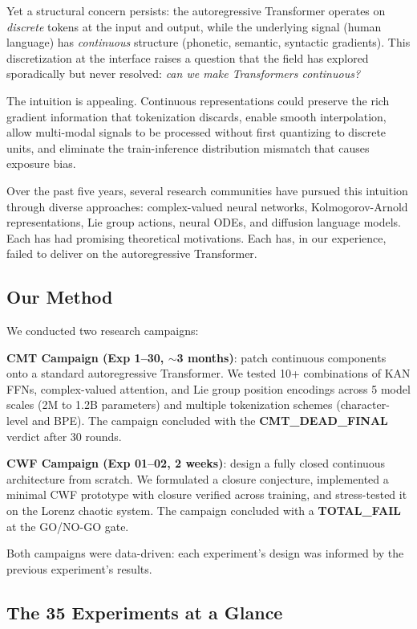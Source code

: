\documentclass{article}
\begin{document}
Yet a structural concern persists: the autoregressive Transformer operates on \emph{discrete} tokens at the input and output, while the underlying signal (human language) has \emph{continuous} structure (phonetic, semantic, syntactic gradients). This discretization at the interface raises a question that the field has explored sporadically but never resolved: \emph{can we make Transformers continuous?}

The intuition is appealing. Continuous representations could preserve the rich gradient information that tokenization discards, enable smooth interpolation, allow multi-modal signals to be processed without first quantizing to discrete units, and eliminate the train-inference distribution mismatch that causes exposure bias.

Over the past five years, several research communities have pursued this intuition through diverse approaches: complex-valued neural networks, Kolmogorov-Arnold representations, Lie group actions, neural ODEs, and diffusion language models. Each has had promising theoretical motivations. Each has, in our experience, failed to deliver on the autoregressive Transformer.

\subsection{Our Method}

We conducted two research campaigns:

\textbf{CMT Campaign (Exp 1--30, $\sim$3 months)}: patch continuous components onto a standard autoregressive Transformer. We tested 10+ combinations of KAN FFNs, complex-valued attention, and Lie group position encodings across 5 model scales (2M to 1.2B parameters) and multiple tokenization schemes (character-level and BPE). The campaign concluded with the \textbf{CMT\_DEAD\_FINAL} verdict after 30 rounds.

\textbf{CWF Campaign (Exp 01--02, 2 weeks)}: design a fully closed continuous architecture from scratch. We formulated a closure conjecture, implemented a minimal CWF prototype with closure verified across training, and stress-tested it on the Lorenz chaotic system. The campaign concluded with a \textbf{TOTAL\_FAIL} at the GO/NO-GO gate.

Both campaigns were data-driven: each experiment's design was informed by the previous experiment's results.

\subsection{The 35 Experiments at a Glance}
\end{document}
